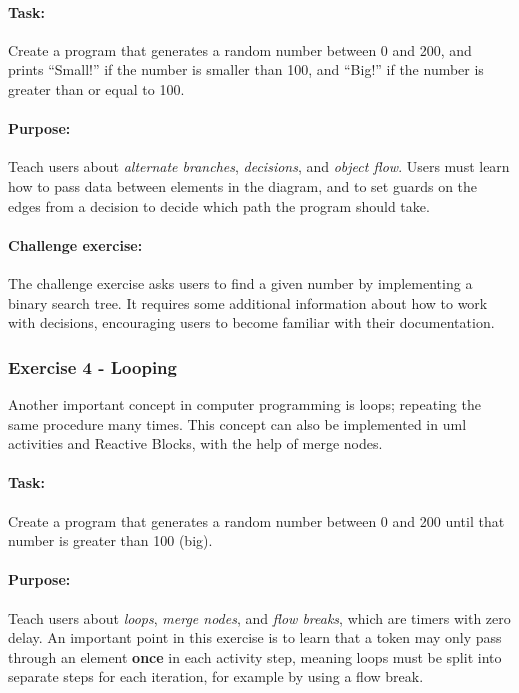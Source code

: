 \paragraph{Task:} Create a program that generates a random number between 0 and 200, and prints ``Small!'' if the number is smaller than 100, and ``Big!'' if the number is greater than or equal to 100.

\paragraph{Purpose:} Teach users about \emph{alternate branches}, \emph{decisions}, and \emph{object flow}. Users must learn how to pass data between elements in the diagram, and to set guards on the edges from a decision to decide which path the program should take.

\paragraph{Challenge exercise:} The challenge exercise asks users to find a given number by implementing a binary search tree. It requires some additional information about how to work with decisions, encouraging users to become familiar with their documentation.

\subsubsection{Exercise 4 - Looping}
Another important concept in computer programming is loops; repeating the same procedure many times. This concept can also be implemented in \gls{uml} activities and Reactive Blocks, with the help of merge nodes.

\paragraph{Task:} Create a program that generates a random number between 0 and 200 until that number is greater than 100 (big).

\paragraph{Purpose:} Teach users about \emph{loops}, \emph{merge nodes}, and \emph{flow breaks}, which are timers with zero delay. An important point in this exercise is to learn that a token may only pass through an element \textbf{once} in each activity step, meaning loops must be split into separate steps for each iteration, for example by using a flow break.

